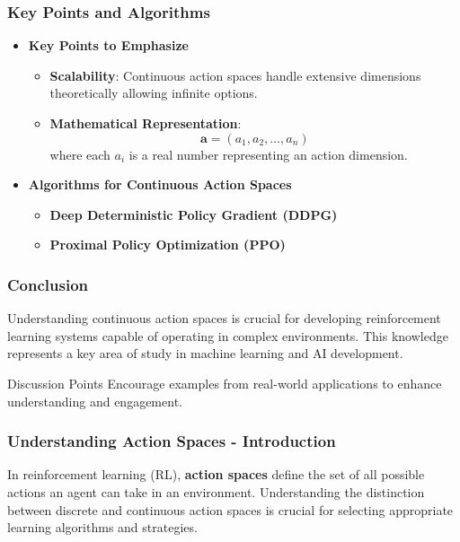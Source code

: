 \documentclass[aspectratio=169]{beamer}
\begin{document}
\begin{frame}[fragile]
    \frametitle{Key Points and Algorithms}
    \begin{itemize}
        \item \textbf{Key Points to Emphasize}
            \begin{itemize}
                \item \textbf{Scalability}: Continuous action spaces handle extensive dimensions theoretically allowing infinite options.
                \item \textbf{Mathematical Representation}:
                \begin{equation}
                    \mathbf{a} = (a_1, a_2, \ldots, a_n)
                \end{equation}
                where each \(a_i\) is a real number representing an action dimension.
            \end{itemize}

        \item \textbf{Algorithms for Continuous Action Spaces}
            \begin{itemize}
                \item \textbf{Deep Deterministic Policy Gradient (DDPG)}
                \item \textbf{Proximal Policy Optimization (PPO)}
            \end{itemize}
    \end{itemize}
\end{frame}

\begin{frame}[fragile]
    \frametitle{Conclusion}
    Understanding continuous action spaces is crucial for developing reinforcement learning systems capable of operating in complex environments. This knowledge represents a key area of study in machine learning and AI development.
    \begin{block}{Discussion Points}
        Encourage examples from real-world applications to enhance understanding and engagement.
    \end{block}
\end{frame}

\begin{frame}[fragile]
    \frametitle{Understanding Action Spaces - Introduction}
    In reinforcement learning (RL), \textbf{action spaces} define the set of all possible actions an agent can take in an environment. Understanding the distinction between discrete and continuous action spaces is crucial for selecting appropriate learning algorithms and strategies.
\end{frame}
\end{document}
